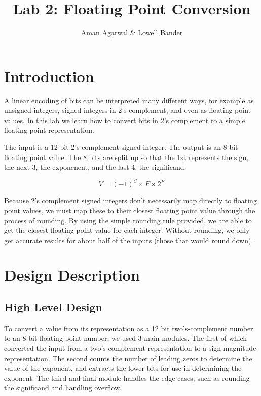 \documentclass[]{article}
\newcommand{\subtitle}[1]{%
  \posttitle{%
    \par\end{center}
    \begin{center}\large#1\end{center}
    \vskip0.5em}%
}
\begin{document}
\title{Lab 2: Floating Point Conversion}
\subtitle{CS M152A}
\author{Aman Agarwal \& Lowell Bander}

\maketitle
\tableofcontents \newpage

\section{Introduction}

A linear encoding of bits can be interpreted many different ways, for example as unsigned integers, signed integers in 2's complement, and even as floating point values. In this lab we learn how to convert bits in 2's complement to a simple floating point representation.

The input is a 12-bit 2's complement signed integer. The output is an 8-bit floating point value. The 8 bits are split up so that the 1st represents the sign, the next 3, the exponenent, and the last 4, the significand.

\begin{displaymath}
V = (-1)^S \times F \times 2^E
\end{displaymath}

Because 2's complement signed integers don't necessarily map directly to floating point values, we must map these to their closest floating point value through the process of rounding. By using the simple rounding rule provided, we are able to get the closest floating point value for each integer. Without rounding, we only get accurate results for about half of the inputs (those that would round down).

\section{Design Description}

\subsection{High Level Design}
\label{subsec:highlevel}

To convert a value from its representation as a 12 bit two's-complement number to an 8 bit floating point number, we used 3 main modules. The first of which converted the input from a two's complement representation to a sign-magnitude representation. The second counts the number of leading zeros to determine the value of the exponent, and extracts the lower bits for use in determining the exponent. The third and final module handles the edge cases, such as rounding the significand and handling overflow.\\
\end{document}
